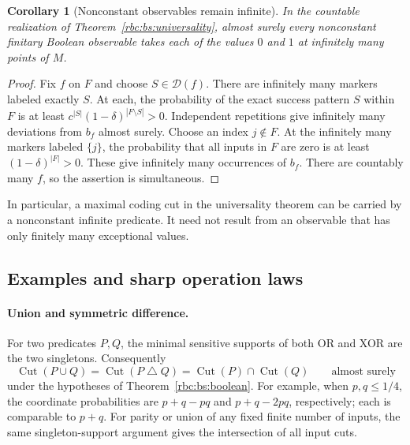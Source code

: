 \documentclass[11pt]{article}
\numberwithin{equation}{section}
\newtheorem{corollary}[theorem]{Corollary}
\theoremstyle{definition}
\theoremstyle{remark}
\newcommand{\Cut}{\operatorname{Cut}}
\begin{document}
\begin{corollary}[Nonconstant observables remain infinite]
\label{rbc:bs:infinite-observables}
In the countable realization of Theorem~\ref{rbc:bs:universality}, almost
surely every nonconstant finitary Boolean observable takes each of the
values $0$ and $1$ at infinitely many points of $M$.
\end{corollary}

\begin{proof}
Fix $f$ on $F$ and choose $S\in\mathcal D(f)$.  There are infinitely many
markers labeled exactly $S$.  At each, the probability of the exact
success pattern $S$ within $F$ is at least
$c^{|S|}(1-\delta)^{|F\setminus S|}>0$.  Independent repetitions give
infinitely many deviations from $b_f$ almost surely.  Choose an index
$j\notin F$.  At the infinitely many markers labeled $\{j\}$, the
probability that all inputs in $F$ are zero is at least
$(1-\delta)^{|F|}>0$.  These give infinitely many occurrences of $b_f$.
There are countably many $f$, so the assertion is simultaneous.
\end{proof}

In particular, a maximal coding cut in the universality theorem can be
carried by a nonconstant infinite predicate.  It need not result from an
observable that has only finitely many exceptional values.

\subsection{Examples and sharp operation laws}

\paragraph{Union and symmetric difference.}
For two predicates $P,Q$, the minimal sensitive supports of both OR and
XOR are the two singletons.  Consequently
\begin{equation}
\label{rbc:bs:or-xor}
  \Cut(P\cup Q)=\Cut(P\mathbin{\triangle}Q)
       =\Cut(P)\cap\Cut(Q)
       \qquad\text{almost surely}
\end{equation}
under the hypotheses of Theorem~\ref{rbc:bs:boolean}.  For example, when
$p,q\leq1/4$, the coordinate probabilities are
$p+q-pq$ and $p+q-2pq$, respectively; each is comparable to $p+q$.
For parity or union of any fixed finite number of inputs, the same
singleton-support argument gives the intersection of all input cuts.
\end{document}
